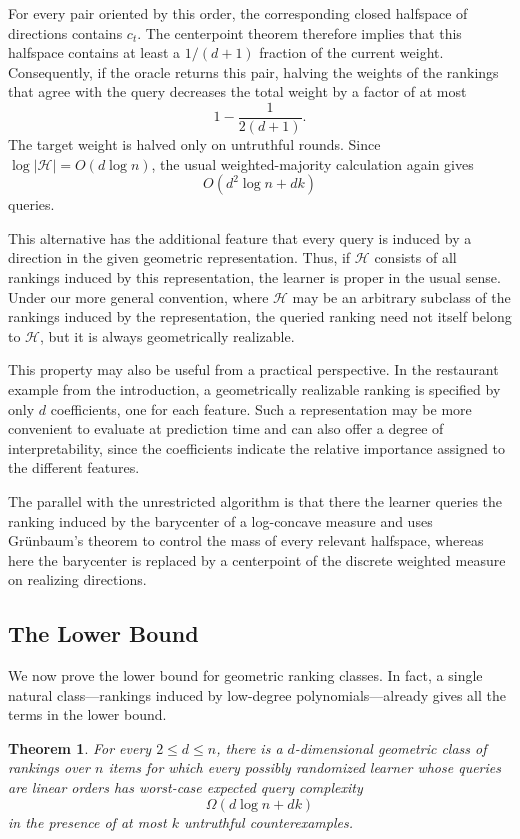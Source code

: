 \documentclass[11pt]{article}
\newtheorem{theorem}{Theorem}[section]
\theoremstyle{definition}
\theoremstyle{remark}
\begin{document}
For every pair oriented by this order, the corresponding closed halfspace
of directions contains $c_t$. The centerpoint theorem therefore implies
that this halfspace contains at least a $1/(d+1)$ fraction of the current
weight. Consequently, if the oracle returns this pair, halving the weights
of the rankings that agree with the query decreases the total weight by a
factor of at most
\[
    1-\frac{1}{2(d+1)}.
\]
The target weight is halved only on untruthful rounds. Since
$\log|\mathcal H|=O(d\log n)$, the usual weighted-majority calculation again
gives
\[
    O(d^2\log n+dk)
\]
queries.

This alternative has the additional feature that every query is induced by
a direction in the given geometric representation. Thus, if
$\mathcal H$ consists of all rankings induced by this representation, the
learner is proper in the usual sense. Under our more general convention,
where $\mathcal H$ may be an arbitrary subclass of the rankings induced by
the representation, the queried ranking need not itself belong to
$\mathcal H$, but it is always geometrically realizable.

This property may also be useful from a practical perspective. In the
restaurant example from the introduction, a geometrically realizable
ranking is specified by only $d$ coefficients, one for each feature. Such
a representation may be more convenient to evaluate at prediction time
and can also offer a degree of interpretability, since the coefficients
indicate the relative importance assigned to the different features.

The parallel with the unrestricted algorithm is that there the learner
queries the ranking induced by the barycenter of a log-concave measure and
uses Gr\"unbaum's theorem to control the mass of every relevant halfspace,
whereas here the barycenter is replaced by a centerpoint of the discrete
weighted measure on realizing directions.


\subsection{The Lower Bound}
\label{sec:geometric-lower}

We now prove the lower bound for geometric ranking classes. In fact, a
single natural class---rankings induced by low-degree polynomials---already
gives all the terms in the lower bound.

\begin{theorem}
\label{thm:geometric-lower}
For every $2\leq d\leq n$, there is a $d$-dimensional geometric class of
rankings over $n$ items for which every possibly randomized learner whose
queries are linear orders has worst-case expected query complexity
\[
    \Omega(d\log n+dk)
\]
in the presence of at most $k$ untruthful counterexamples.
\end{theorem}
\end{document}
